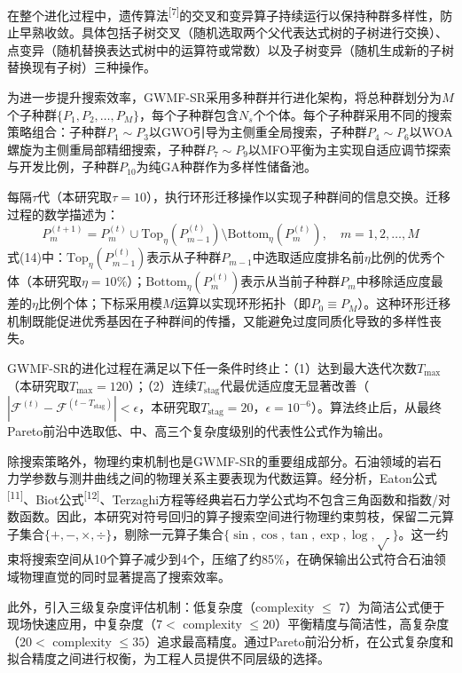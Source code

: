 \documentclass[a4paper,12pt]{ctexart}
\begin{document}
在整个进化过程中，遗传算法\textsuperscript{[7]}的交叉和变异算子持续运行以保持种群多样性，防止早熟收敛。具体包括子树交叉（随机选取两个父代表达式树的子树进行交换）、点变异（随机替换表达式树中的运算符或常数）以及子树变异（随机生成新的子树替换现有子树）三种操作。

为进一步提升搜索效率，GWMF-SR采用多种群并行进化架构，将总种群划分为$M$个子种群$\{P_1, P_2, \ldots, P_M\}$，每个子种群包含$N_s$个个体。每个子种群采用不同的搜索策略组合：子种群$P_1 \sim P_3$以GWO引导为主侧重全局搜索，子种群$P_4 \sim P_6$以WOA螺旋为主侧重局部精细搜索，子种群$P_7 \sim P_9$以MFO平衡为主实现自适应调节探索与开发比例，子种群$P_{10}$为纯GA种群作为多样性储备池。

每隔$\tau$代（本研究取$\tau=10$），执行环形迁移操作以实现子种群间的信息交换。迁移过程的数学描述为：
\begin{equation}
P_m^{(t+1)} = P_m^{(t)} \cup \text{Top}_\eta(P_{m-1}^{(t)}) \setminus \text{Bottom}_\eta(P_m^{(t)}), \quad m = 1, 2, \ldots, M \tag{14}
\end{equation}
式(14)中：$\text{Top}_\eta(P_{m-1}^{(t)})$表示从子种群$P_{m-1}$中选取适应度排名前$\eta$比例的优秀个体（本研究取$\eta=10\%$）；$\text{Bottom}_\eta(P_m^{(t)})$表示从当前子种群$P_m$中移除适应度最差的$\eta$比例个体；下标采用模$M$运算以实现环形拓扑（即$P_0 \equiv P_M$）。这种环形迁移机制既能促进优秀基因在子种群间的传播，又能避免过度同质化导致的多样性丧失。

GWMF-SR的进化过程在满足以下任一条件时终止：（1）达到最大迭代次数$T_{\max}$（本研究取$T_{\max}=120$）；（2）连续$T_{\text{stag}}$代最优适应度无显著改善（$|\mathcal{F}^{(t)} - \mathcal{F}^{(t-T_{\text{stag}})}| < \epsilon$，本研究取$T_{\text{stag}}=20$，$\epsilon=10^{-6}$）。算法终止后，从最终Pareto前沿中选取低、中、高三个复杂度级别的代表性公式作为输出。

除搜索策略外，物理约束机制也是GWMF-SR的重要组成部分。石油领域的岩石力学参数与测井曲线之间的物理关系主要表现为代数运算。经分析，Eaton公式\textsuperscript{[11]}、Biot公式\textsuperscript{[12]}、Terzaghi方程等经典岩石力学公式均不包含三角函数和指数/对数函数。因此，本研究对符号回归的算子搜索空间进行物理约束剪枝，保留二元算子集合$\{+, -, \times, \div\}$，剔除一元算子集合$\{\sin, \cos, \tan, \exp, \log, \sqrt{~}\}$。这一约束将搜索空间从10个算子减少到4个，压缩了约85\%，在确保输出公式符合石油领域物理直觉的同时显著提高了搜索效率。

此外，引入三级复杂度评估机制：低复杂度（complexity $\leq$ 7）为简洁公式便于现场快速应用，中复杂度（$7 <$ complexity $\leq 20$）平衡精度与简洁性，高复杂度（$20 <$ complexity $\leq 35$）追求最高精度。通过Pareto前沿分析，在公式复杂度和拟合精度之间进行权衡，为工程人员提供不同层级的选择。
\end{document}
